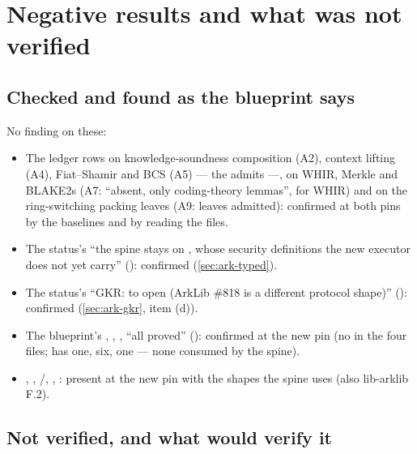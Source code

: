 \section{Negative results and what was not verified}\label{sec:ark-negative}

\subsection{Checked and found as the blueprint says}

No finding on these:
\begin{itemize}
\item The ledger rows on knowledge-soundness composition (A2), context lifting (A4), Fiat--Shamir
  and BCS (A5) --- the admits ---, on WHIR, Merkle and BLAKE2s (A7: ``absent, only coding-theory
  lemmas'', for WHIR) and on the ring-switching packing leaves (A9: leaves admitted): confirmed
  at both pins by the baselines and by reading the files.
\item The status's ``the spine stays on , whose security definitions the
  new executor does not yet carry'' (): confirmed (\cref{sec:ark-typed}).
\item The status's ``GKR: to open (ArkLib \#818 is a different protocol shape)''
  (): confirmed (\cref{sec:ark-gkr}, item (d)).
\item The blueprint's , , ,
   ``all proved'' (): confirmed at the new pin (no  in the
  four files;  has one,  six,
   one --- none consumed by the spine).
\item {}, , /,
  , : present at the new pin with the shapes the spine
  uses (also lib-arklib F.2).
\end{itemize}

\subsection{Not verified, and what would verify it}

